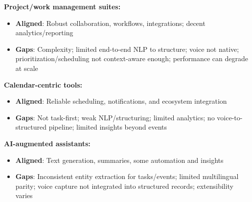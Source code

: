\documentclass[12pt,a4paper]{article}
\begin{document}
\textbf{Project/work management suites:}
\begin{itemize}
    \renewcommand\labelitemi{-}
    \item \textbf{Aligned}: Robust collaboration, workflows, integrations; decent analytics/reporting
    \item \textbf{Gaps}: Complexity; limited end-to-end NLP to structure; voice not native; prioritization/scheduling not context-aware enough; performance can degrade at scale
\end{itemize}

\textbf{Calendar-centric tools:}
\begin{itemize}
    \renewcommand\labelitemi{-}
    \item \textbf{Aligned}: Reliable scheduling, notifications, and ecosystem integration
    \item \textbf{Gaps}: Not task-first; weak NLP/structuring; limited analytics; no voice-to-structured pipeline; limited insights beyond events
\end{itemize}

\textbf{AI-augmented assistants:}
\begin{itemize}
    \renewcommand\labelitemi{-}
    \item \textbf{Aligned}: Text generation, summaries, some automation and insights
    \item \textbf{Gaps}: Inconsistent entity extraction for tasks/events; limited multilingual parity; voice capture not integrated into structured records; extensibility varies
\end{itemize}
\end{document}
